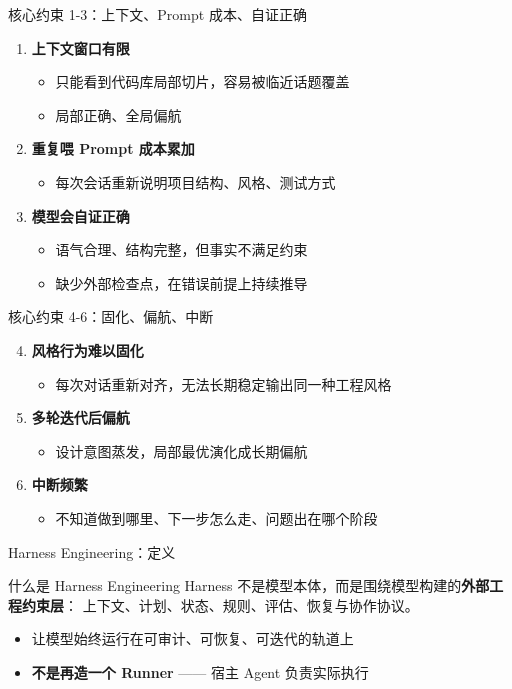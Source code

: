 \documentclass[theme=workflow,aspectratio=169,fontset=tech]{Hypo-Slide}
\begin{document}
\begin{frame}{核心约束 1-3：上下文、Prompt 成本、自证正确}
  \begin{enumerate}
    \item \textbf{上下文窗口有限}
    \begin{itemize}
      \item 只能看到代码库局部切片，容易被临近话题覆盖
      \item 局部正确、全局偏航
    \end{itemize}
    \item \textbf{重复喂 Prompt 成本累加}
    \begin{itemize}
      \item 每次会话重新说明项目结构、风格、测试方式
    \end{itemize}
    \item \textbf{模型会自证正确}
    \begin{itemize}
      \item 语气合理、结构完整，但事实不满足约束
      \item 缺少外部检查点，在错误前提上持续推导
    \end{itemize}
  \end{enumerate}
\end{frame}

\begin{frame}{核心约束 4-6：固化、偏航、中断}
  \begin{enumerate}\setcounter{enumi}{3}
    \item \textbf{风格行为难以固化}
    \begin{itemize}
      \item 每次对话重新对齐，无法长期稳定输出同一种工程风格
    \end{itemize}
    \item \textbf{多轮迭代后偏航}
    \begin{itemize}
      \item 设计意图蒸发，局部最优演化成长期偏航
    \end{itemize}
    \item \textbf{中断频繁}
    \begin{itemize}
      \item 不知道做到哪里、下一步怎么走、问题出在哪个阶段
    \end{itemize}
  \end{enumerate}
\end{frame}

\begin{frame}{Harness Engineering：定义}
  \begin{block}{什么是 Harness Engineering}
    Harness 不是模型本体，而是围绕模型构建的\textbf{外部工程约束层}：
    上下文、计划、状态、规则、评估、恢复与协作协议。
  \end{block}
  \begin{itemize}
    \item 让模型始终运行在可审计、可恢复、可迭代的轨道上
    \item \textbf{不是再造一个 Runner} —— 宿主 Agent 负责实际执行
  \end{itemize}
\end{frame}
\end{document}
